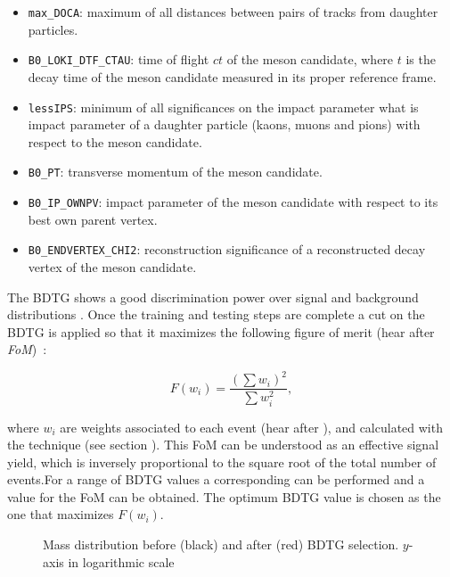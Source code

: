 \begin{itemize}
\item{} \texttt{max\_DOCA}: maximum of all distances between pairs of tracks from daughter particles.
\item{} \texttt{B0\_LOKI\_DTF\_CTAU}: time of flight $ct$ of the \Bs meson candidate, where
$t$ is the decay time of the \Bs meson candidate measured in its proper reference frame.
\item{} \texttt{lessIPS}: minimum of all significances on the impact parameter {\color{red} what is impact parameter} of a daughter particle (kaons, muons and pions) with respect to the \Bs meson candidate.
\item{} \texttt{B0\_PT}: transverse momentum of the \Bs meson candidate.
\item{} \texttt{B0\_IP\_OWNPV}: impact parameter of the \Bs meson candidate with respect to its best own parent vertex.
\item{} \texttt{B0\_ENDVERTEX\_CHI2}: reconstruction significance of a reconstructed decay vertex of the \Bs meson candidate.
\end{itemize}

The BDTG shows a good discrimination power over signal and background distributions .
Once the training and testing steps are complete a cut on the BDTG is applied so that it maximizes the following figure of merit
(hear after {\it FoM})~\cite{Yuehong_fom}:

\begin{equation}
\label{eqn:fom}
F(w_i) = \frac{\left(\sum{w_{i}}\right)^2}{\sum{w_{i}^2}},
\end{equation}

\noindent where $w_i$ are weights associated to each event (hear after \sWeights), and calculated with the \sPlot technique (see section ). 
This FoM can be understood as an effective signal yield, which is inversely proportional to the square root of the total number of events.For a range of BDTG values
a corresponding \sPlot can be performed and a value for the FoM can be obtained. The optimum BDTG value is chosen as the one that maximizes $F(w_i)$.


\begin{figure}[h]
\begin{center}
  \scalebox{1}{}
  \caption{Mass distribution before (black) and after (red) BDTG selection. $y$-axis in logarithmic scale}
  \label{mass_BDTG_selection}
\end{center}
\end{figure}

